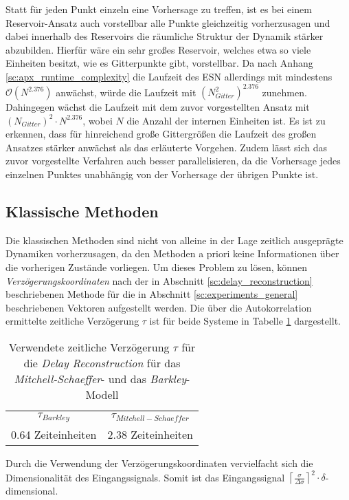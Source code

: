 Statt für jeden Punkt einzeln eine Vorhersage zu treffen, ist es bei einem Reservoir-Ansatz auch vorstellbar alle Punkte gleichzeitig vorherzusagen und dabei innerhalb des Reservoirs die räumliche Struktur der Dynamik stärker abzubilden. Hierfür wäre ein sehr großes Reservoir, welches etwa so viele Einheiten besitzt, wie es Gitterpunkte gibt, vorstellbar. Da nach Anhang \ref{sc:apx_runtime_complexity} die Laufzeit des \textsc{ESN} allerdings mit mindestens $\mathcal{O}(N^{2.376})$ anwächst, würde die Laufzeit mit $(N_{Gitter}^2)^{2.376}$ zunehmen. Dahingegen wächst die Laufzeit mit dem zuvor vorgestellten Ansatz mit $(N_{Gitter})^2 \cdot N^{2.376}$, wobei $N$ die Anzahl der internen Einheiten ist. Es ist zu erkennen, dass für hinreichend große Gittergrößen die Laufzeit des großen Ansatzes stärker anwächst als das erläuterte Vorgehen. Zudem lässt sich das zuvor vorgestellte Verfahren auch besser parallelisieren, da die Vorhersage jedes einzelnen Punktes unabhängig von der Vorhersage der übrigen Punkte ist.   

\FloatBarrier
\subsection{Klassische Methoden}
\label{sec:experiments_general_classical}
Die klassischen Methoden sind nicht von alleine in der Lage zeitlich ausgeprägte Dynamiken vorherzusagen, da den Methoden a priori keine Informationen über die vorherigen Zustände vorliegen. Um dieses Problem zu lösen, können \textit{Verzögerungskoordinaten} nach der in Abschnitt \ref{sc:delay_reconstruction} beschriebenen Methode für die in Abschnitt \ref{sc:experiments_general} beschriebenen Vektoren aufgestellt werden. Die über die Autokorrelation ermittelte zeitliche Verzögerung $\tau$ ist für beide Systeme in Tabelle \ref{tab:delay_reconstruction_tau} dargestellt.     

\begin{table}[h]
\centering
\begin{tabular}{cc}
\hline
$\tau_{Barkley}$ & $\tau_{Mitchell-Schaeffer}$ \\ 
0.64 Zeiteinheiten & 2.38 Zeiteinheiten\\ 
\hline 
\end{tabular} 
\caption{Verwendete zeitliche Verzögerung $\tau$ für die \textit{Delay Reconstruction} für das \textit{Mitchell-Schaeffer}- und das \textit{Barkley}-Modell}
\label{tab:delay_reconstruction_tau}
\end{table} 

Durch die Verwendung der Verzögerungskoordinaten vervielfacht sich die Dimensionalität des Eingangssignals. Somit ist das Eingangssignal $\left \lceil \frac{\sigma}{\Delta\sigma} \right \rceil^2 \cdot \delta$-dimensional. 



